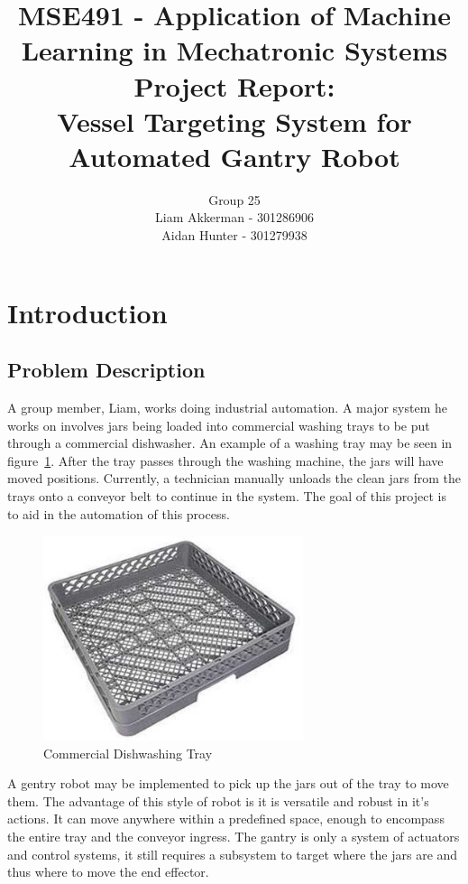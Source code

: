 \documentclass[11pt]{article}
\title{{\large MSE491 - Application of Machine Learning in Mechatronic Systems} \\ Project Report: \\ Vessel Targeting System for Automated Gantry Robot}
\author{Group 25 \\ Liam Akkerman - 301286906 \\ Aidan Hunter - 301279938}
\begin{document}
    \maketitle
    \vfill
	\setcounter{tocdepth}{2} %
    \tableofcontents %
    \FloatBarrier 
    \newpage

    \FloatBarrier
    \section{Introduction}
        \subsection{Problem Description}
            A group member, Liam, works doing industrial automation. A major system he works on involves jars being loaded into commercial washing trays to be put through a commercial dishwasher. An example of a washing tray may be seen in figure~\ref{fig:tray}. After the tray passes through the washing machine, the jars will have moved positions. Currently, a technician manually unloads the clean jars from the trays onto a conveyor belt to continue in the system. The goal of this project is to aid in the automation of this process.

            \begin{figure}[ht]
                \centering
                \includegraphics[height=6cm]{images/tray.jpg}
                \caption{Commercial Dishwashing Tray}\label{fig:tray}
            \end{figure}

            A gentry robot may be implemented to pick up the jars out of the tray to move them. The advantage of this style of robot is it is versatile and robust in it's actions. It can move anywhere within a predefined space, enough to encompass the entire tray and the conveyor ingress. The gantry is only a system of actuators and control systems, it still requires a subsystem to target where the jars are and thus where to move the end effector. 
            
\end{document}

